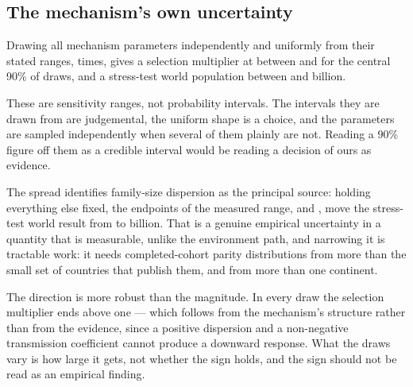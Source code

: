 \subsection{The mechanism's own uncertainty}

Drawing all \MechanismParameterCount{} mechanism parameters independently and
uniformly from their stated ranges, \MechanismDraws{} times, gives a selection
multiplier at \ProjectionEndYear{} between \RaceEnsembleEffectLow{} and
\RaceEnsembleEffectHigh{} for the central 90\% of draws, and a stress-test world
population between \RaceEnsembleLow{} and \RaceEnsembleHigh{} billion.

These are sensitivity ranges, not probability intervals. The intervals they are
drawn from are judgemental, the uniform shape is a choice, and the parameters are
sampled independently when several of them plainly are not. Reading a 90\% figure
off them as a credible interval would be reading a decision of ours as evidence.

The spread identifies family-size dispersion as the principal source: holding
everything else fixed, the endpoints of the
measured range, \FamilySizeCVLow{} and \FamilySizeCVHigh{}, move the stress-test
world result from \CVLowWorld{} to \CVHighWorld{} billion. That is a genuine
empirical uncertainty in a quantity that is measurable, unlike the environment
path, and narrowing it is tractable work: it needs completed-cohort parity
distributions from more than the small set of countries that publish them, and
from more than one continent.

The direction is more robust than the magnitude. In every draw the selection
multiplier ends above one --- which follows from the mechanism's structure rather
than from the evidence, since a positive dispersion and a non-negative
transmission coefficient cannot produce a downward response. What the draws vary
is how large it gets, not whether the sign holds, and the sign should not be read
as an empirical finding.

